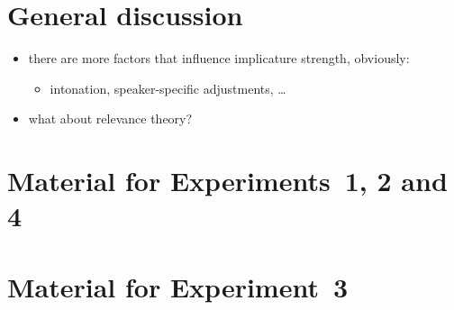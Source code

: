 \documentclass[12pt]{article}
\begin{document}
\section{General discussion}
\label{sec:general-discussion}

\begin{itemize}
\item there are more factors that influence implicature strength, obviously:
  \begin{itemize}
  \item intonation, speaker-specific adjustments, \dots
  \end{itemize}
\item what about relevance theory?
\end{itemize}

\appendix

\section{Material for Experiments~1, 2 and 4}
\label{sec:mater-exper-1}


\section{Material for Experiment~3}
\label{sec:mater-exper-3}




\end{document}

